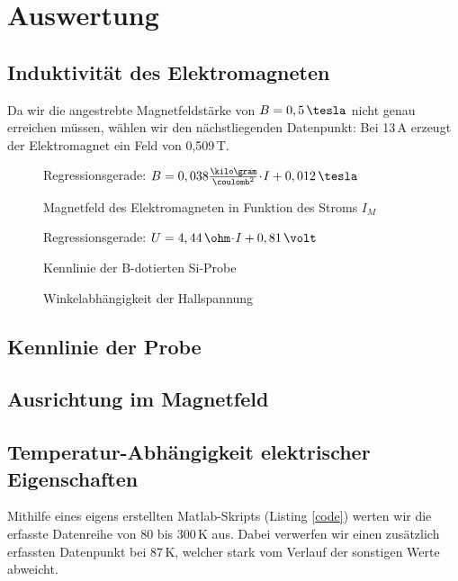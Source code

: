 \newpage
\section{Auswertung}

\subsection{Induktivität des Elektromagneten}

% 

Da wir die angestrebte Magnetfeldstärke von $B = 0,5 \,\tesla$ nicht genau erreichen müssen, wählen wir den nächstliegenden Datenpunkt: Bei 13\,A erzeugt der Elektromagnet ein Feld von 0,509\,T.

\begin{figure}[p]
\centering

\caption{Magnetfeld des Elektromagneten in Funktion des Stroms $I_M$}
\label{fig:plot_B}
Regressionsgerade: $B = 0,038 \frac{\kilo\gram}{\coulomb^2}  \cdt  I  +  0,012\,\tesla$
\end{figure}

\begin{figure}[p]
\centering

\caption{Kennlinie der \textsf{B}-dotierten \textsf{Si}-Probe}
\label{fig:plot_Kenn}
Regressionsgerade: $U = 4,44\,\ohm \cdt  I  +  0,81\,\volt$
\end{figure}

\begin{figure}[p]
\centering

\caption{Winkelabhängigkeit der Hallspannung}
\label{fig:plot_alpha}
\vspace{-7em}
\end{figure}

\subsection{Kennlinie der Probe}

\subsection{Ausrichtung im Magnetfeld}

\subsection{Temperatur-Abhängigkeit elektrischer Eigenschaften} 
Mithilfe eines eigens erstellten Matlab-Skripts (Listing \ref{code}) werten wir die erfasste Datenreihe von 80 bis 300\,K aus. Dabei verwerfen wir einen zusätzlich erfassten Datenpunkt bei 87\,K, welcher stark vom Verlauf der sonstigen Werte abweicht.

